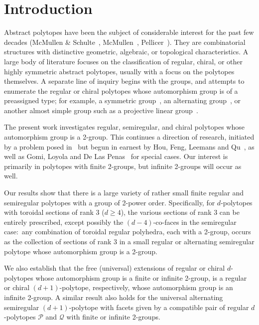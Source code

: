 \documentclass[12pt]{amsart}
\theoremstyle{definition}
\begin{document}
\section{Introduction}
\label{intro}

Abstract polytopes have been the subject of considerable interest for the past few decades (McMullen \& Schulte~\cite{McMSch2002}, McMullen~\cite{McM2020}, Pellicer~\cite{Pel2025}). They are combinatorial structures with distinctive geometric, algebraic, or topological characteristics. A large body of literature focuses on the classification of regular, chiral, or other highly symmetric abstract polytopes, usually with a focus on the polytopes themselves. A separate line of inquiry begins with the groups, and attempts to enumerate the regular or chiral polytopes whose automorphism group is of a preassigned type; for example, a symmetric group~\cite{CFL2024}, an alternating group~\cite{CFLM2017,CHO2024}, or another almost simple group such as a projective linear group~\cite{BroLee2016,BroVic2010,LeeSch2007}.

The present work investigates regular, semiregular, and chiral polytopes whose automorphism group is a 2-group. This continues a direction of research, initiated by a problem posed in~\cite{SchWei2006} but begun in earnest by Hou, Feng, Leemans and Qu~\cite{HFL2019a,HFL2019b,HFL2020,HFL2025,HFLQ2025}, as well as Gomi, Loyola and De Las Penas~\cite{GLD2018,Loy2018} for special cases. Our interest is primarily in polytopes with finite 2-groups, but infinite 2-groups will occur as well.

Our results show that there is a large variety of rather small finite regular and semiregular polytopes with a group of 2-power order. Specifically, for $d$-polytopes with toroidal sections of rank 3 ($d\geq 4$), the various sections of rank $3$ can be entirely prescribed, except possibly the $(d-4)$-co-faces in the semiregular case:\ any combination of toroidal regular polyhedra, each with a 2-group, occurs as the collection of sections of rank 3 in a small regular or alternating semiregular polytope whose automorphism group is a 2-group.

We also establish that the free (universal) extensions of regular or chiral $d$-polytopes whose automorphism group is a finite or infinite 2-group, is a regular or chiral $(d+1)$-polytope, respectively, whose automorphism group is an infinite 2-group. A similar result also holds for the universal alternating semiregular $(d+1)$-polytope with facets given by a compatible pair of regular $d$-polytopes $\mathcal P$ and $\mathcal Q$ with finite or infinite 2-groups.
\end{document}
